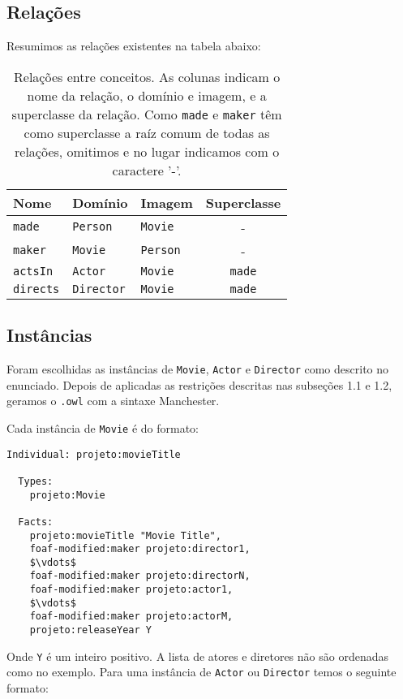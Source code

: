 \documentclass{article}
\newcommand{\code}[1]{\lstinline[mathescape=true]{#1}}
\begin{document}
\subsection{Relações}

Resumimos as relações existentes na tabela abaixo:
\newpage

\begin{table}[h]
  \centering
  \begin{tabular}{lllc}
    Nome & Domínio & Imagem & Superclasse\\
    \midrule
    \code{made} & \code{Person} & \code{Movie} & -\\
    \code{maker} & \code{Movie} & \code{Person} & -\\
    \code{actsIn} & \code{Actor} & \code{Movie} & \code{made}\\
    \code{directs} & \code{Director} & \code{Movie} & \code{made}\\
  \end{tabular}
  \captionsetup{justification=raggedright}
  \caption{Relações entre conceitos. As colunas indicam o nome da relação, o domínio e imagem, e a
  superclasse da relação. Como \code{made} e \code{maker} têm como superclasse a raíz comum de
  todas as relações, omitimos e no lugar indicamos com o caractere '-'.}
\end{table}

\subsection{Instâncias}

Foram escolhidas as instâncias de \code{Movie}, \code{Actor} e \code{Director} como descrito no
enunciado. Depois de aplicadas as restrições descritas nas subseções 1.1 e 1.2, geramos o
\code{.owl} com a sintaxe Manchester.

Cada instância de \code{Movie} é do formato:

\begin{lstlisting}[frame=single,mathescape=true]
Individual: projeto:movieTitle

  Types:
    projeto:Movie

  Facts:
    projeto:movieTitle "Movie Title",
    foaf-modified:maker projeto:director1,
    $\vdots$
    foaf-modified:maker projeto:directorN,
    foaf-modified:maker projeto:actor1,
    $\vdots$
    foaf-modified:maker projeto:actorM,
    projeto:releaseYear Y
\end{lstlisting}

Onde \code{Y} é um inteiro positivo. A lista de atores e diretores não são ordenadas como no
exemplo. Para uma instância de \code{Actor} ou \code{Director} temos o seguinte formato:
\end{document}
